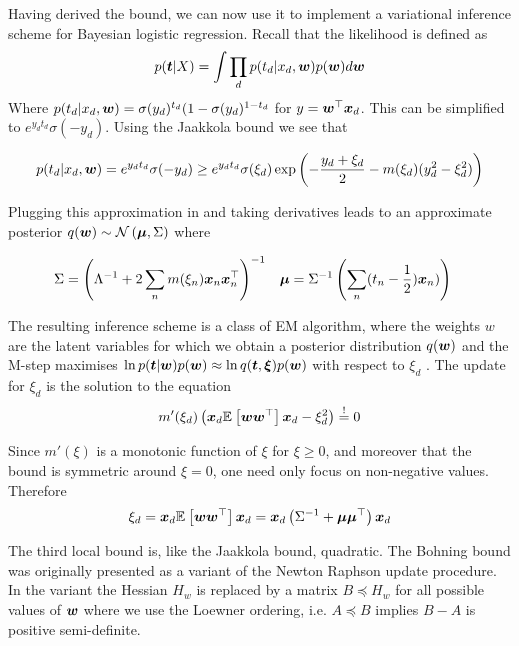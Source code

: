 Having derived the bound, we can now use it to implement a variational inference scheme for Bayesian logistic regression. Recall that the likelihood is defined as
\begin{align}
p(\bm t|X) = \int \prod_d p(t_d | x_d, \bm w) p(\bm w) d\bm w
\end{align}
Where $p(t_d | x_d, \bm w) = \sigma(y_d)^{t_d}(1- \sigma(y_d)^{1-t_d}$ for $y = \bm w^\top\bm x_d$. This can be simplified to $e^{y_d t_d}\sigma(-y_d)$. Using the Jaakkola bound we see that

\begin{equation}
p(t_d | x_d, \bm w) = e^{y_d t_d}\sigma(-y_d) \geq e^{y_d t_d} \sigma(\xi_d) \exp\left( -\frac{y_d + \xi_d}{2} - m(\xi_d)(y_d^2 - \xi_d^2)\right)
\end{equation}

Plugging this approximation in and taking derivatives leads to an approximate posterior $q(\bm w) \sim \mathcal{N} \left( {\bm \mu}, {\Sigma} \right)$ where

\begin{align}
\Sigma & = {\left( {\Lambda}^{-1} + 2 \sum_n m(\xi_n)\bm x_n\bm x_n^\top \right)}^{-1} & \bm \mu & = {\Sigma}^{-1} \left(\sum_n (t_n - \frac{1}{2}) \bm x_n)\right)
\end{align}

The resulting inference scheme is a class of EM algorithm, where the weights $w$ are the latent variables for which we obtain a posterior distribution $q(\bm w)$ and the M-step maximises $\ln p(\bm t| \bm w)p(\bm w) \approx \ln q(\bm t, \bm \xi)p(\bm w)$  with respect to $\xi_d$ . The update for $\xi_d$ is the solution to the equation
\begin{align}
m'(\xi_d) \left( \bm x_d \mathbb{E}_{ {  } }\left[ \bm w\bm w^\top \right]\bm x_d - \xi^2_d \right) \overset{!}{=} 0
\end{align}

Since $m'(\xi)$ is a monotonic function of $\xi$ for $\xi \geq 0$, and moreover that the bound is symmetric around $\xi = 0$, one need only focus on non-negative values. Therefore
\begin{align}
\xi_d = \bm x_d \mathbb{E}_{ {  } }\left[ \bm w \bm w^\top  \right] \bm x_d = \bm x_d \left( {\Sigma}^{-1} + \bm \mu \bm \mu^\top \right) \bm x_d
\end{align}

The third local bound is, like the Jaakkola bound, quadratic. The Bohning bound  was originally presented \cite{Bohning1988a} as a variant of the Newton Raphson update procedure. In the variant the Hessian $H_w$ is replaced by a matrix $B \preceq H_w$ for all possible values of $\bm w$ where we use the Loewner ordering, i.e. $A \preceq B$ implies $B - A$ is positive semi-definite.

